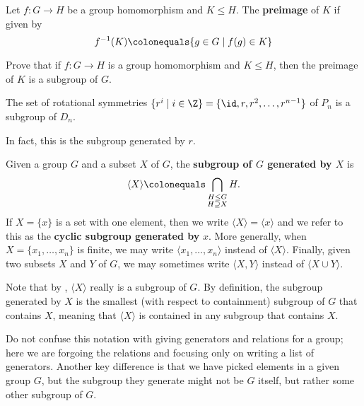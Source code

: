 \begin{definition}
Let $f\!:G\to H$ be a group homomorphism and $K\leq H$. The {\bf preimage} of $K$ if given by
$$f^{-1}(K) \colonequals \{g\in G \mid f(g)\in K\}$$
\end{definition}


\begin{exercise}\label{preimage is a subgroup}
Prove that if $f\!:G\to H$ is a group homomorphism and $K\leq H$, then the preimage of $K$ is a subgroup of $G$.
\end{exercise}




\begin{exercise}\label{rotations subgroup of D_n}
	The set of rotational symmetries $\{ r^i \mid i \in \Z \} = \{\id, r, r^2, \dots, r^{n-1}\}$ of $P_n$ is a subgroup of $D_{n}$.
\end{exercise}


In fact, this is the subgroup generated by $r$.


\begin{definition}
Given a group $G$ and a subset $X$ of $G$, the {\bf subgroup of $G$ generated by $X$} is
$$\langle X \rangle \colonequals \bigcap_{\substack{H \leq G \\ H \supseteq X}} H.$$
If $X=\{x\}$ is a set with one element, then we write $\langle X \rangle=\langle x \rangle$ and we refer to this as the {\bf cyclic subgroup generated by} $x$. More generally, when $X = \{ x_1, \ldots, x_n \}$ is finite, we may write $\langle x_1, \ldots, x_n \rangle$ instead of $\langle X \rangle$. Finally, given two subsets $X$ and $Y$ of $G$, we may sometimes write $\langle X, Y \rangle$ instead of $\langle X \cup Y \rangle$.
\end{definition}


\begin{remark}
Note that by , $\langle X \rangle$ really is a subgroup of $G$. By definition, the subgroup generated by $X$ is the smallest (with respect to containment) subgroup of $G$ that contains $X$, meaning that $\langle X \rangle$ is contained in any subgroup that contains $X$.
\end{remark}


\begin{remark}
	Do not confuse this notation with giving generators and relations for a group; here we are forgoing the relations and focusing only on writing a list of generators. Another key difference is that we have picked elements in a given group $G$, but the subgroup they generate might not be $G$ itself, but rather some other subgroup of $G$.
\end{remark}


